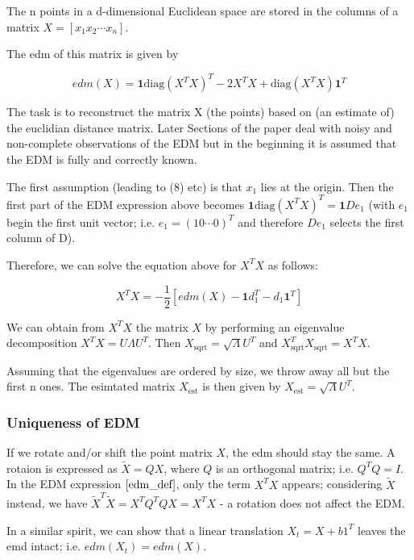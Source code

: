 The n points in a d-dimensional Euclidean space are stored in the
columns of a matrix \(X = [x_1 x_2 \cdots x_n]\).

The edm of this matrix is given by


\begin{equation}
\label{edm_def}
edm(X) = \mathbf{1} \text{diag}(X^T X)^T - 2 X^T X + \text{diag}(X^T X) \mathbf{1}^T
\end{equation}


The task is to reconstruct the matrix X (the points) based on (an
estimate of) the euclidian distance matrix. Later Sections of the paper
deal with noisy and non-complete observations of the EDM but in the
beginning it is assumed that the EDM is fully and correctly known.

The first assumption (leading to (8) etc) is that \(x_1\) lies at the
origin. Then the first part of the EDM expression above becomes
\(\mathbf{1} \text{diag}(X^T X)^T = \mathbf{1} D e_1\) (with \(e_1\)
begin the first unit vector; i.e. \(e_1 = (1 0 \cdots 0)^T\) and
therefore \(D e_1\) selects the first column of D).

Therefore, we can solve the equation above for \(X^T X\) as follows:

\[
X^T X = -\frac{1}{2} \left[ edm(X) - \mathbf{1} d_1^T - d_1 \mathbf{1}^T \right]
\]

We can obtain from \(X^T X\) the matrix \(X\) by performing an
eigenvalue decomposition \(X^T X = U \Lambda U^T\). Then
\(X_{\text{sqrt}} = \sqrt{\Lambda} U^T\) and
\(X_{\text{sqrt}}^T X_{\text{sqrt}} = X^T X\).

Assuming that the eigenvalues are ordered by size, we throw away all but
the first n ones. The esimtated matrix \(X_{\text{est}}\) is then given
by \(X_{\text{est}} = \sqrt{\Lambda} U^T\).

\subsubsection{Uniqueness of EDM}\label{uniqueness-of-edm}

If we rotate and/or shift the point matrix \(X\), the edm should stay
the same. A rotaion is expressed as \(\tilde{X} = QX\), where \(Q\) is
an orthogonal matrix; i.e. \(Q^T Q = I\). In the EDM expression
\(\eqref{edm_def}\), only the term \(X^T X\) appears; considering
\(\tilde{X}\) instead, we have
\(\tilde{X}^T \tilde{X} = X^T Q^T Q X = X^T X\) - a rotation does not
affect the EDM.

In a similar spirit, we can show that a linear translation
\(X_t = X + b 1^T\) leaves the emd intact; i.e. \(edm(X_t) = edm(X)\).

